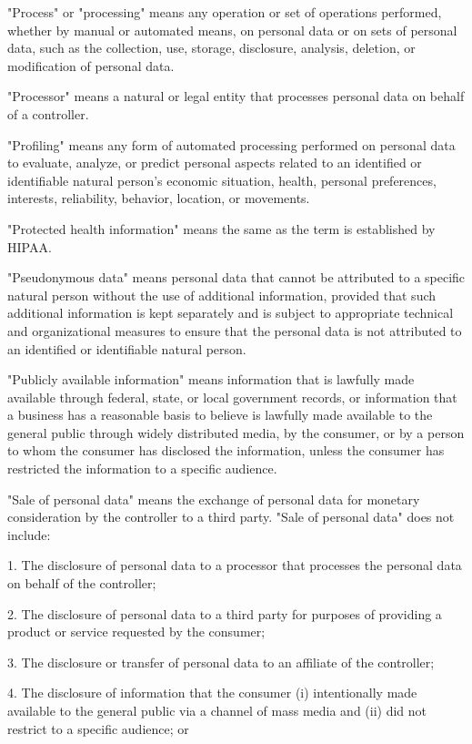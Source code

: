 "Process" or "processing" means any operation or set of operations performed, whether by manual or automated means, on personal data or on sets of personal data, such as the collection, use, storage, disclosure, analysis, deletion, or modification of personal data.

"Processor" means a natural or legal entity that processes personal data on behalf of a controller.

"Profiling" means any form of automated processing performed on personal data to evaluate, analyze, or predict personal aspects related to an identified or identifiable natural person's economic situation, health, personal preferences, interests, reliability, behavior, location, or movements.

"Protected health information" means the same as the term is established by HIPAA.

"Pseudonymous data" means personal data that cannot be attributed to a specific natural person without the use of additional information, provided that such additional information is kept separately and is subject to appropriate technical and organizational measures to ensure that the personal data is not attributed to an identified or identifiable natural person.

"Publicly available information" means information that is lawfully made available through federal, state, or local government records, or information that a business has a reasonable basis to believe is lawfully made available to the general public through widely distributed media, by the consumer, or by a person to whom the consumer has disclosed the information, unless the consumer has restricted the information to a specific audience.

"Sale of personal data" means the exchange of personal data for monetary consideration by the controller to a third party. "Sale of personal data" does not include:

1. The disclosure of personal data to a processor that processes the personal data on behalf of the controller;

2. The disclosure of personal data to a third party for purposes of providing a product or service requested by the consumer;

3. The disclosure or transfer of personal data to an affiliate of the controller;

4. The disclosure of information that the consumer (i) intentionally made available to the general public via a channel of mass media and (ii) did not restrict to a specific audience; or

